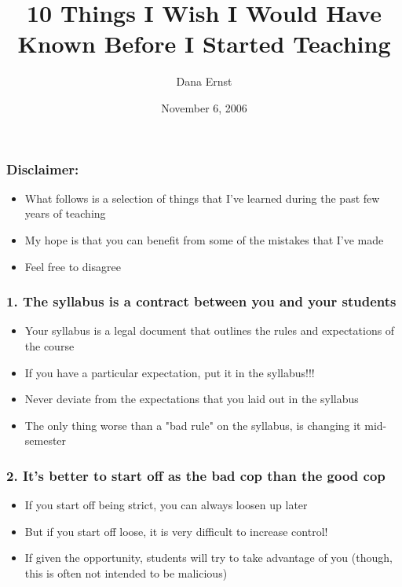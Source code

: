 \documentclass{beamer}
\begin{document}
\title[10 Things I Wish I Would Have Known]{10 Things I Wish I Would Have Known Before I Started Teaching}
\author{Dana Ernst}
\date{November 6, 2006}
\frame{\titlepage}

\begin{frame}
\frametitle{Disclaimer:}
\begin{itemize}
	\pause 
  \item What follows is a selection of things that I've learned during the past few years of teaching
    	\pause 
  \item My hope is that you can benefit from some of the mistakes that I've made
    	\pause 
  \item Feel free to disagree
  \end{itemize}
\end{frame}


\begin{frame}
\frametitle{1. The syllabus is a contract between you and your students}
\begin{itemize}
	\pause 
  \item Your syllabus is a legal document that outlines the rules and expectations of the course
  	\pause 
  \item If you have a particular expectation, put it in the syllabus!!!
  	\pause 
  \item \alert{Never} deviate from the expectations that you laid out in the syllabus
  	\pause
  \item The only thing worse than a "bad rule" on the syllabus, is changing it mid-semester
\end{itemize}
\end{frame}

\begin{frame}
\frametitle{2. It's better to start off as the bad cop than the good cop }
\begin{itemize}
	\pause 
  \item If you start off being strict, you can always loosen up later
  	\pause 
  \item But if you start off loose, it is very difficult to increase control!
    	\pause 
  \item If given the opportunity, students will try to take advantage of you (though, this is often not intended to be malicious)
\end{itemize}
\end{frame}
\end{document}
